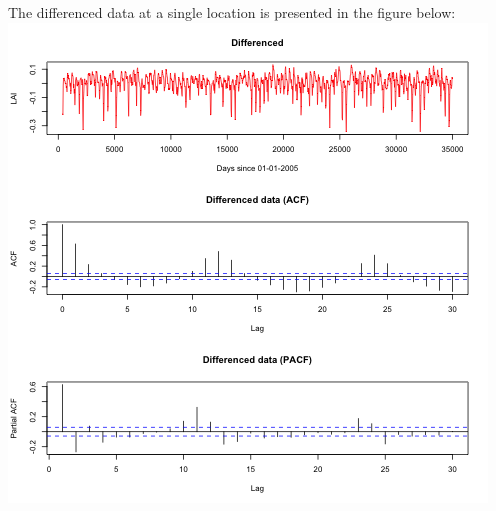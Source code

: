 \documentclass[11pt]{article}
\begin{document}
The differenced data at a single location is presented in the figure below:
\includegraphics{../img/differenced_acf_pacf.png}
\end{document}
